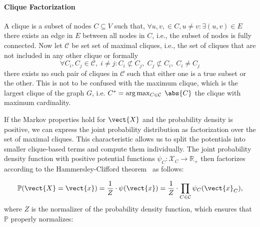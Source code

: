 \paragraph*{Clique Factorization}

A clique is a subset of nodes $C \subseteq V$ such that, $\forall u,v,  \in C, u \neq v: \exists (u,v) \in E$ there exists an edge in $E$ between all nodes in $C$, i.e., the subset of nodes is fully connected.
Now let $\mathcal{C}$ be set set of maximal cliques, i.e., the set of cliques that are not included in any other clique or formally 
\begin{equation}
    \forall C_i, C_j \in \mathcal{C},\; i \neq j  : C_i \not\subset C_j,\; C_j \not\subset C_i,\; C_i \neq C_j
\end{equation}
there exists no such pair of cliques in $\mathcal{C}$ such that either one is a true subset or the other.
This is not to be confused with the maximum clique, which is the largest clique of the graph $G$, i.e. $C^* = \arg\max_{C \in \mathcal{C}} \; \abs{C}$ the clique with maximum cardinality.

If the Markov properties hold for $\vect{X}$ and the probability density is positive, we can express the joint probability distribution as factorization over the set of maximal cliques.
This characteristic allows us to split the potentials into smaller clique-based terms and compute them individually. 
The joint probability density function with positive potential functions $\psi_C: \mathcal{X}_C \rightarrow \mathbb{R}_+$ then factorizes according to the Hammersley-Clifford theorem~\cite{hammersley1971markov} as follows:

\begin{equation}
        \mathbb{P}(\vect{X}=\vect{x}) = \frac{1}{Z} \cdot \psi(\vect{x})= \frac{1}{Z} \cdot \prod_{C \in \mathcal{C}} \psi_C(\vect{x}_C),
\end{equation}
where $Z$ is the normalizer of the probability density function, which ensures that $\mathbb{P}$  properly normalizes:

